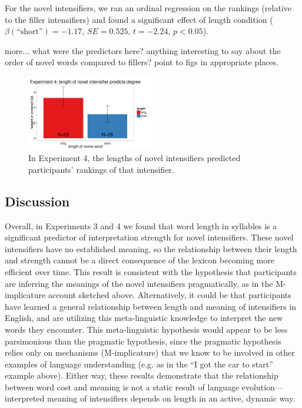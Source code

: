 \documentclass[10pt,letterpaper]{article}
\newcommand{\ndg}[1]{{\color{green}#1}}
\begin{document}
For the novel intensifiers, we ran an ordinal regression on the rankings (relative to the filler intensifiers) and found a significant effect of length condition ($\beta(\mbox{``short''})=-1.17$, $SE=0.525$, $t=-2.24$, $p<0.05$).

\ndg{more... what were the predictors here? anything interesting to say about the order of novel words compared to fillers? point to figs in appropriate places.}

\begin{figure}[hbt]
\begin{center}
\includegraphics[width=0.5\textwidth]{exp4.pdf}
\end{center}
\caption{In Experiment 4, the lengths of novel intensifiers predicted participants' rankings of that intensifier.}
\label{exp4_novel}
\end{figure}

\subsection{Discussion}
Overall, in Experiments 3 and 4 we found that word length in syllables is a significant predictor of interpretation strength for novel intensifiers. These novel intensifiers have no established meaning, so the relationship between their length and strength cannot be a direct consequence of the lexicon becoming more efficient over time. This result is consistent with the hypothesis that participants are inferring the meanings of the novel intensifiers pragmatically, as in the M-implicature account sketched above. 
Alternatively, it could be that participants have learned a general relationship between length and meaning of intensifiers in English, and are utilizing this meta-linguistic knowledge to interpret the new words they encounter. 
This meta-linguistic hypothesis would appear to be less parsimonious than the pragmatic hypothesis, since the pragmatic hypothesis relies only on mechanisms (M-implicature) that we know to be involved in other examples of language understanding (e.g. as in the ``I got the car to start'' example above).
Either way, these results demonstrate that the relationship between word cost and meaning is not a static result of language evolution---interpreted meaning of intensifiers depends on length in an active, dynamic way.
\end{document}
